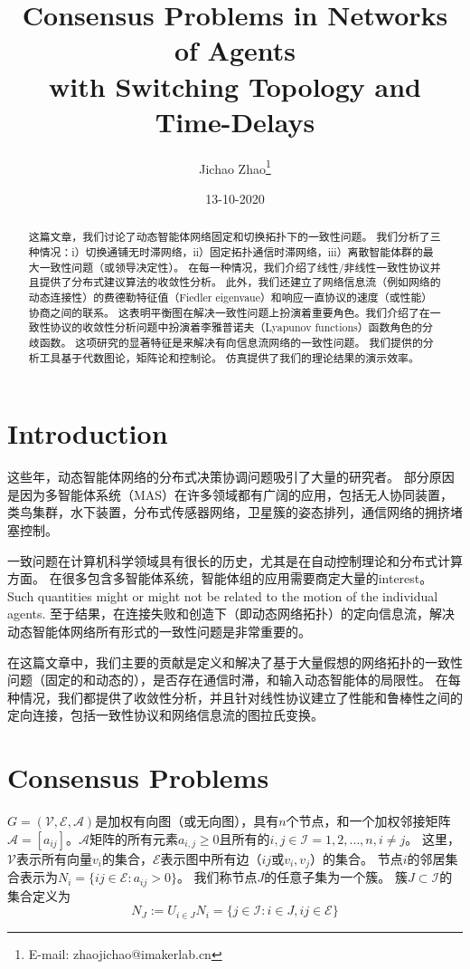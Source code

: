 \documentclass{article}
\title{Consensus Problems in Networks of Agents\\ with Switching Topology and Time-Delays}
\author{ Jichao Zhao\thanks{E-mail: zhaojichao@imakerlab.cn}}
\date{13-10-2020}
\begin{document}
\maketitle

\begin{abstract}
这篇文章，我们讨论了动态智能体网络固定和切换拓扑下的一致性问题。
我们分析了三种情况：i）切换通铺无时滞网络，ii）固定拓扑通信时滞网络，iii）离散智能体群的最大一致性问题（或领导决定性）。
在每一种情况，我们介绍了线性/非线性一致性协议并且提供了分布式建议算法的收敛性分析。
此外，我们还建立了网络信息流（例如网络的动态连接性）的费德勒特征值（Fiedler eigenvaue）和响应一直协议的速度（或性能）协商之间的联系。
这表明平衡图在解决一致性问题上扮演着重要角色。我们介绍了在一致性协议的收敛性分析问题中扮演着李雅普诺夫（Lyapunov functions）函数角色的分歧函数。
这项研究的显著特征是来解决有向信息流网络的一致性问题。
我们提供的分析工具基于代数图论，矩阵论和控制论。
仿真提供了我们的理论结果的演示效率。
\end{abstract}

\section{Introduction}
这些年，动态智能体网络的分布式决策协调问题吸引了大量的研究者。
部分原因是因为多智能体系统（MAS）在许多领域都有广阔的应用，包括无人协同装置，类鸟集群，水下装置，分布式传感器网络，卫星簇的姿态排列，通信网络的拥挤堵塞控制。


一致问题在计算机科学领域具有很长的历史，尤其是在自动控制理论和分布式计算方面。
在很多包含多智能体系统，智能体组的应用需要商定大量的interest。
Such quantities might or might not be related to the motion of the individual agents. 
至于结果，在连接失败和创造下（即动态网络拓扑）的定向信息流，解决动态智能体网络所有形式的一致性问题是非常重要的。


在这篇文章中，我们主要的贡献是定义和解决了基于大量假想的网络拓扑的一致性问题（固定的和动态的），是否存在通信时滞，和输入动态智能体的局限性。
在每种情况，我们都提供了收敛性分析，并且针对线性协议建立了性能和鲁棒性之间的定向连接，包括一致性协议和网络信息流的图拉氏变换。

\section{Consensus Problems}
$G=(\mathcal{V},\mathcal{E},\mathcal{A})$是加权有向图（或无向图），具有$n$个节点，和一个加权邻接矩阵$\mathcal{A}=[a_{ij}]$。$\mathcal{A}$矩阵的所有元素$a_{i,j} \ge 0$且所有的$i,j \in \mathcal{I}={1,2,…,n},i \ne j$。
这里，$\mathcal{V}$表示所有向量$v_i$的集合，$\mathcal{E}$表示图中所有边（$ij$或$v_i,v_j$）的集合。
节点$i$的邻居集合表示为$N_i=\{ij\in \mathcal{E}:a_{ij}>0\}$。
我们称节点$J$的任意子集为一个簇。
簇$J\subset \mathcal{I}$的集合定义为
\begin{equation}
    N_J:=U_{i\in J}N_i=\{j\in \mathcal{I}:i\in J, ij\in \mathcal{E}\}
\end{equation}
\end{document}
